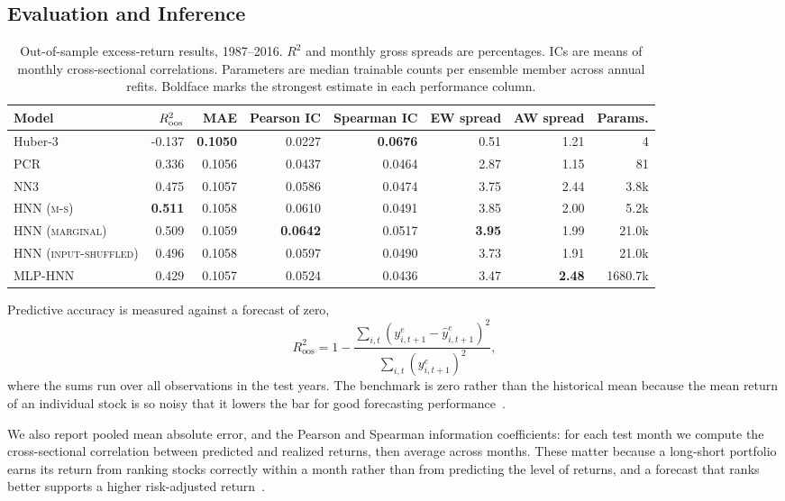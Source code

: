 \documentclass[sigconf,nonacm]{acmart}
\newcommand{\HNNMarg}{\textsc{HNN (marginal)}}
\newcommand{\HNNMS}{\textsc{HNN (m-s)}}
\newcommand{\HNNShuffle}{\textsc{HNN (input-shuffled)}}
\begin{document}
\subsection{Evaluation and Inference}
\begin{table}[!b]
\centering
\caption{Out-of-sample excess-return results, 1987--2016. \(R^2\) and monthly
gross spreads are percentages. ICs are means of monthly cross-sectional
correlations. Parameters are median trainable counts per ensemble member across
annual refits. Boldface marks the strongest estimate in each performance
column.}
\label{tab:main}
\small
\setlength{\tabcolsep}{3.5pt}
\begin{tabular}{lrrrrrrr}
\toprule
Model & $R^2_{\rm oos}$ & MAE & Pearson IC & Spearman IC
& EW spread & AW spread & Params.\\
\midrule
Huber-3 & -0.137 & \textbf{0.1050} & 0.0227 & \textbf{0.0676} & 0.51 & 1.21 & 4\\
PCR & 0.336 & 0.1056 & 0.0437 & 0.0464 & 2.87 & 1.15 & 81\\
NN3 & 0.475 & 0.1057 & 0.0586 & 0.0474 & 3.75 & 2.44 & 3.8k\\
\HNNMS{} & \textbf{0.511} & 0.1058 & 0.0610 & 0.0491 & 3.85 & 2.00 & 5.2k\\
\HNNMarg{} & 0.509 & 0.1059 & \textbf{0.0642} & 0.0517 & \textbf{3.95} & 1.99 & 21.0k\\
\HNNShuffle & 0.496 & 0.1058 & 0.0597 & 0.0490 & 3.73 & 1.91 & 21.0k\\
MLP-HNN & 0.429 & 0.1057 & 0.0524 & 0.0436 & 3.47 & \textbf{2.48} & 1680.7k\\
\bottomrule

\end{tabular}
\end{table}
Predictive accuracy is measured against a
forecast of zero,
\begin{equation}
 R^2_{\mathrm{oos}}=1-
 \frac{\sum_{i,t}(y^e_{i,t+1}-\widehat y^e_{i,t+1})^2}
      {\sum_{i,t}(y^e_{i,t+1})^2},
 \label{eq:r2}
\end{equation}
where the sums run over all observations in the test years. The benchmark is
zero rather than the historical mean because the mean return of an individual
stock is so noisy that it lowers the bar for good forecasting
performance~\cite{gu2020}.

We also report pooled mean absolute error, and the Pearson and Spearman
information coefficients: for each test month we compute the cross-sectional
correlation between predicted and realized returns, then average across months.
These matter because a long-short portfolio earns its return from ranking stocks
correctly within a month rather than from predicting the level of returns, and a
forecast that ranks better supports a higher risk-adjusted
return~\cite{grinold2000}.
\end{document}
